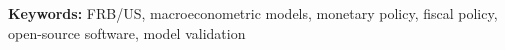 \documentclass[11pt]{article}
\begin{document}
\medskip
\noindent\textbf{Keywords:} FRB/US, macroeconometric models, monetary policy, fiscal policy, open-source software, model validation

\newpage











\newpage

\end{document}
